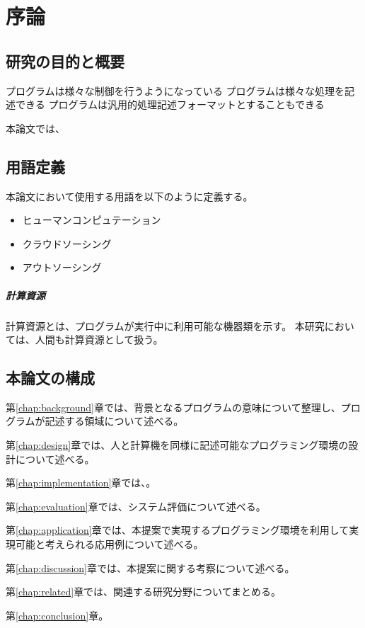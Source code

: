 \chapter{序論}\label{chap:introduction}

\section{研究の目的と概要}\label{ux7814ux7a76ux306eux76eeux7684ux3068ux6982ux8981}

プログラムは様々な制御を行うようになっている
プログラムは様々な処理を記述できる
プログラムは汎用的処理記述フォーマットとすることもできる

本論文では、

\section{用語定義}\label{ux7528ux8a9eux5b9aux7fa9}

本論文において使用する用語を以下のように定義する。

\begin{itemize}
\itemsep1pt\parskip0pt
\item
  ヒューマンコンピュテーション
\item
  クラウドソーシング
\item
  アウトソーシング
\end{itemize}

\paragraph{計算資源}\label{ux8a08ux7b97ux8cc7ux6e90}

計算資源とは、プログラムが実行中に利用可能な機器類を示す。
本研究においては、人間も計算資源として扱う。

\section{本論文の構成}\label{ux672cux8ad6ux6587ux306eux69cbux6210}

第\ref{chap:background}章では、背景となるプログラムの意味について整理し、プログラムが記述する領域について述べる。

第\ref{chap:design}章では、人と計算機を同様に記述可能なプログラミング環境の設計について述べる。

第\ref{chap:implementation}章では、。

第\ref{chap:evaluation}章では、システム評価について述べる。

第\ref{chap:application}章では、本提案で実現するプログラミング環境を利用して実現可能と考えられる応用例について述べる。

第\ref{chap:discussion}章では、本提案に関する考察について述べる。

第\ref{chap:related}章では、関連する研究分野についてまとめる。

第\ref{chap:conclusion}章。
